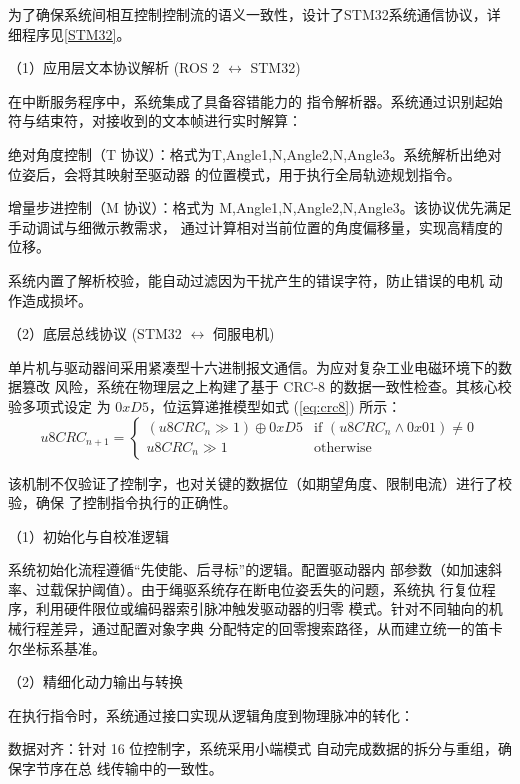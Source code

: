 为了确保系统间相互控制控制流的语义一致性，设计了STM32系统通信协议，详细程序见\ref{STM32}。

（1）应用层文本协议解析 (ROS 2 $\leftrightarrow$ STM32)

在中断服务程序中，系统集成了具备容错能力的
指令解析器。系统通过识别起始符与结束符，对接收到的文本帧进行实时解算：

 绝对角度控制（T 协议）：格式为T,Angle1,N,Angle2,N,Angle3。系统解析出绝对位姿后，会将其映射至驱动器
    的位置模式，用于执行全局轨迹规划指令。


    增量步进控制（M 协议）：格式为 
M,Angle1,N,Angle2,N,Angle3。该协议优先满足手动调试与细微示教需求，
    通过计算相对当前位置的角度偏移量，实现高精度的位移。

系统内置了解析校验，能自动过滤因为干扰产生的错误字符，防止错误的电机
动作造成损坏。

（2）底层总线协议 (STM32 $\leftrightarrow$ 伺服电机)

单片机与驱动器间采用紧凑型十六进制报文通信。为应对复杂工业电磁环境下的数据篡改
风险，系统在物理层之上构建了基于 CRC-8 的数据一致性检查。其核心校验多项式设定
为 $0xD5$，位运算递推模型如式 (\ref{eq:crc8}) 所示：
\begin{equation}
\label{eq:crc8}
u8CRC_{n+1} =
\begin{cases}
(u8CRC_n \gg 1) \oplus 0xD5 & \text{if } (u8CRC_n \wedge 0x01) \neq 0 \\
u8CRC_n \gg 1 & \text{otherwise}
\end{cases}
\end{equation}

该机制不仅验证了控制字，也对关键的数据位（如期望角度、限制电流）进行了校验，确保
了控制指令执行的正确性。

（1）初始化与自校准逻辑

系统初始化流程遵循“先使能、后寻标”的逻辑。配置驱动器内
部参数（如加速斜率、过载保护阈值）。由于绳驱系统存在断电位姿丢失的问题，系统执
行复位程序，利用硬件限位或编码器索引脉冲触发驱动器的归零
模式。针对不同轴向的机械行程差异，通过配置对象字典
分配特定的回零搜索路径，从而建立统一的笛卡尔坐标系基准。

（2）精细化动力输出与转换

在执行指令时，系统通过接口实现从逻辑角度到物理脉冲的转化：

 数据对齐：针对 16 位控制字，系统采用小端模式 自动完成数据的拆分与重组，确保字节序在总
     线传输中的一致性。

